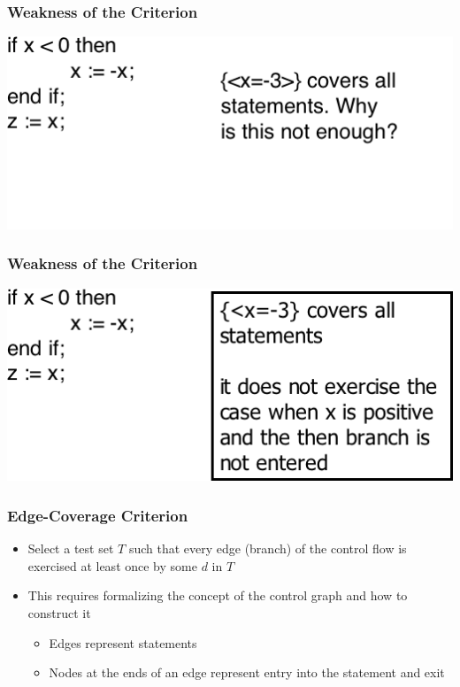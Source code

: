 \documentclass[t,12pt,numbers,fleqn]{beamer}
\begin{document}

\begin{frame}
\frametitle{Weakness of the Criterion}

\includegraphics[scale=0.6]{../Figures/WeaknessStatementCoverageOnlyCode.png}

\end{frame}


\begin{frame}
\frametitle{Weakness of the Criterion}

\includegraphics[scale=0.6]{../Figures/WeaknessStatementCoverage.png}

\end{frame}


\begin{frame}
\frametitle{Edge-Coverage Criterion}

\begin{itemize}
\item Select a test set $T$ such that every edge (branch) of the control flow is
  exercised at least once by some $d$ in $T$
\item This requires formalizing the concept of the control graph and how to construct it
\begin{itemize}
\item Edges represent statements
\item Nodes at the ends of an edge represent entry into the statement and exit
\end{itemize}
\end{itemize}

\end{frame}
\end{document}
